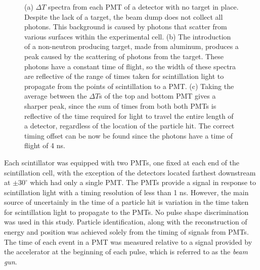 \begin{figure}[htbp]
\caption{(a) $\Delta T$ spectra from each PMT of a detector with no target in place.
Despite the lack of a target, the beam dump does not collect all photons.
This background is caused by photons that scatter from various surfaces within the experimental cell.
(b) The introduction of a non-neutron producing target, made from aluminum, produces a peak caused by the scattering of photons from the target.
These photons have a constant time of flight, so the width of these spectra are reflective of the range of times taken for scintillation light to propagate from the points of scintillation to a PMT.
(c) Taking the average between the $\Delta T$s of the top and bottom PMT gives a sharper peak, since the sum of times from both both PMTs is reflective of the time required for light to travel the entire length of a detector, regardless of the location of the particle hit.
The correct timing offset can be now be found since the photons have a time of flight of 4 ns. }
\label{fig:ToFDetermination}
\end{figure}

Each scintillator was equipped with two PMTs, one fixed at each end of the scintillation cell, with the exception of the detectors located farthest downstream at $\pm30^{\circ}$ which had only a single PMT.
The PMTs provide a signal in response to scintillation light with a timing resolution of less than 1 ns.
However, the main source of uncertainly in the time of a particle hit is variation in the time taken for scintillation light to propagate to the PMTs. No pulse shape discrimination was used in this study.
Particle identification, along with the reconstruction of energy and position was achieved solely from the timing of signals from PMTs.
The time of each event in a PMT was measured relative to a signal provided by the accelerator at the beginning of each pulse, which is referred to as the \textit{beam gun}.


